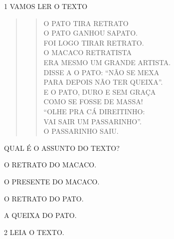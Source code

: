 
\num{1} VAMOS LER O TEXTO

\begin{quote}
\begin{verse}
O PATO TIRA RETRATO\\
O PATO GANHOU SAPATO.\\
FOI LOGO TIRAR RETRATO.\\
O MACACO RETRATISTA\\
ERA MESMO UM GRANDE ARTISTA.\\
DISSE A O PATO: “NÃO SE MEXA\\
PARA DEPOIS NÃO TER QUEIXA”.\\
E O PATO, DURO E SEM GRAÇA\\
COMO SE FOSSE DE MASSA!\\
“OLHE PRA CÁ DIREITINHO:\\
VAI SAIR UM PASSARINHO”.\\
O PASSARINHO SAIU.
\end{verse}

\end{quote}

QUAL É O ASSUNTO DO TEXTO?

\begin{escolha}
\item O RETRATO DO MACACO.

\item O PRESENTE DO MACACO.

\item O RETRATO DO PATO.

\item A QUEIXA DO PATO.
\end{escolha}

\pagebreak
\num{2} LEIA O TEXTO.

